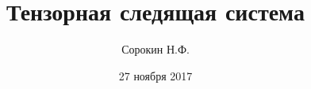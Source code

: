 \documentclass[12pt,a4paper,titlepage]{article}
\begin{document}
\date{27 ноября 2017}

\title{Тензорная следящая система}
\author{Сорокин Н.Ф.}

\maketitle

\newpage


\newpage


\newpage


\newpage


\newpage


\newpage


\newpage


\newpage


\newpage


\newpage


\newpage


\newpage 


\newpage

\end{document}
